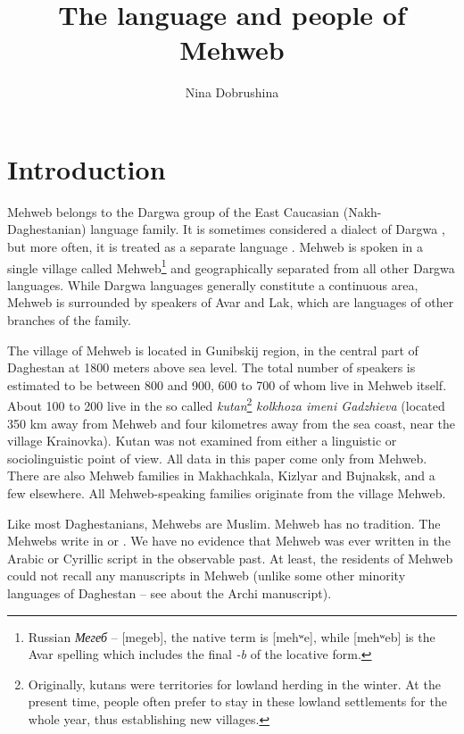 \documentclass[output=paper]{langsci/langscibook}
\title{The language and people of Mehweb}
\author{Nina Dobrushina\affiliation{National Research University Higher School of
  Economics, Linguistic Convergence Laboratory, ndobrushina@hse.ru}}
\begin{document}
\maketitle


\section{%
Introduction}

Mehweb belongs to the Dargwa group of the East Caucasian
(Nakh-\hskip0pt Daghestanian) language family. It is sometimes considered a
dialect of Dargwa \citep{magometov1982}, but more often, it is treated as a
separate language \citep{khajdakov1985,koryakov-sumbatova2007}. Mehweb
is spoken in a single village called Mehweb\footnote{Russian
  \emph{Мегеб} – [megeb], the native term is [mehʷe], while
  [mehʷeb] is the Avar spelling which includes the final \emph{-b}
  of the locative form.} and geographically separated from all
other Dargwa languages. While Dargwa languages generally constitute a
continuous area, Mehweb is surrounded by speakers of Avar and Lak, which
are languages of other branches of the family.

The village of Mehweb is located in Gunibskij region, in the central
part of Daghestan at 1800 meters above sea level. The total number of
speakers is estimated to be between 800 and 900, 600 to 700 of whom
live in Mehweb itself. About 100 to 200 live in the so called
\emph{kutan}\footnote{Originally, kutans were territories for lowland
  herding in the winter. At the present time, people often prefer to
  stay in these lowland settlements for the whole year, thus
  establishing new villages.} \emph{kolkhoza imeni Gadzhieva} (located
350 km away from Mehweb and four kilometres away from the sea coast, near
the village Krainovka). Kutan was not examined from either a linguistic
or sociolinguistic point of view. All data in this paper come only from
Mehweb. There are also Mehweb families in Makhachkala, Kizlyar and
Bujnaksk, and a few elsewhere. All Mehweb-speaking families originate
from the village Mehweb.

Like most Daghestanians, Mehwebs are Muslim. Mehweb has no  tradition. 
The Mehwebs write in  or .
We have no evidence that Mehweb was ever written in the Arabic or
Cyrillic script in the observable past. At least, the residents of
Mehweb could not recall any manuscripts in Mehweb (unlike some other
minority languages of Daghestan – see \citealt{magomedkhanov2009} about the
Archi manuscript).
\end{document}
